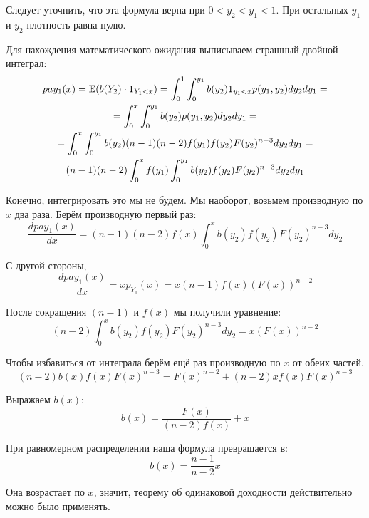 \begin{myex}
Следует уточнить, что эта формула верна при $0<y_{2}<y_{1}<1$. При остальных $ y_{1} $ и $ y_{2} $ плотность равна нулю.

Для нахождения математического ожидания выписываем страшный двойной интеграл:
\begin{multline}
pay_{1}(x)=\mathbb{E}(b(Y_{2})\cdot 1_{Y_{1}<x})=\int_{0}^{1}\int_{0}^{y_{1}} b(y_{2})1_{y_{1}<x} p(y_{1},y_{2})dy_{2}dy_{1}=\\
=\int_{0}^{x}\int_{0}^{y_{1}} b(y_{2})p(y_{1},y_{2})dy_{2}dy_{1}=\\
=\int_{0}^{x}\int_{0}^{y_{1}} b(y_{2}) (n-1)(n-2)f(y_{1})f(y_{2})F(y_{2})^{n-3} dy_{2}dy_{1}=\\
(n-1)(n-2)\int_{0}^{x}f(y_{1})\int_{0}^{y_{1}} b(y_{2}) f(y_{2})F(y_{2})^{n-3} dy_{2}dy_{1}
\end{multline}

Конечно, интегрировать это мы не будем. Мы наоборот, возьмем производную по $ x $ два раза. Берём производную первый раз:
\begin{equation}
\frac{dpay_{1}(x)}{dx}=(n-1)(n-2)f(x)\int_{0}^{x} b(y_{2}) f(y_{2})F(y_{2})^{n-3} dy_{2}
\end{equation}

С другой стороны,
\begin{equation}
\frac{dpay_{1}(x)}{dx}=xp_{Y_{1}}(x)=x(n-1)f(x)(F(x))^{n-2}
\end{equation}

После сокращения $ (n-1) $ и $ f(x) $ мы получили уравнение:
\begin{equation}
(n-2)\int_{0}^{x} b(y_{2}) f(y_{2})F(y_{2})^{n-3} dy_{2}=x(F(x))^{n-2}
\end{equation}

Чтобы избавиться от интеграла берём ещё раз производную по $ x $ от обеих частей.
\begin{equation}
(n-2) b(x) f(x)F(x)^{n-3}=F(x)^{n-2}+(n-2)xf(x)F(x)^{n-3}
\end{equation}

Выражаем $ b(x) $:
\begin{equation}
b(x)=\frac{F(x)}{(n-2)f(x)}+x
\end{equation}

При равномерном распределении наша формула превращается в:
\begin{equation}
b(x)=\frac{n-1}{n-2}x
\end{equation}

Она возрастает по $ x $, значит, теорему об одинаковой доходности действительно можно было применять.
\end{myex}


